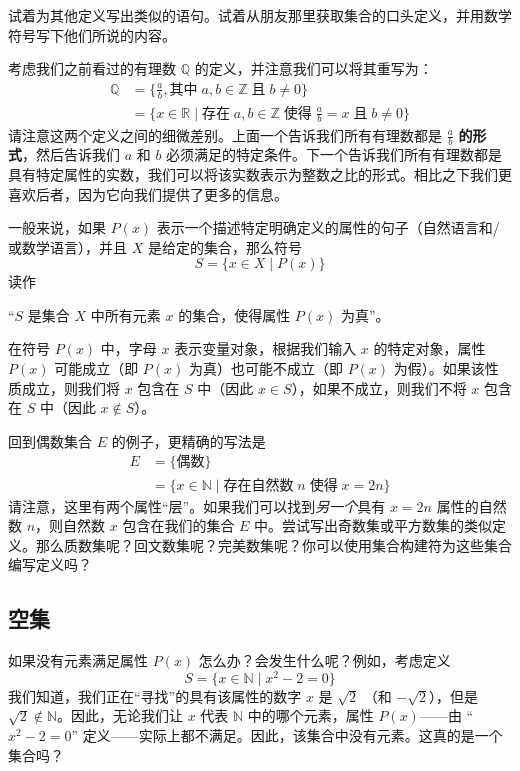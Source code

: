 试着为其他定义写出类似的语句。试着从朋友那里获取集合的口头定义，并用数学符号写下他们所说的内容。

考虑我们之前看过的有理数 $\mathbb{Q}$ 的定义，并注意我们可以将其重写为：
\begin{align*}
    \mathbb{Q} &= \Big\{\frac{a}{b}, \text{其中}\; a,b \in \mathbb{Z} \;\text{且}\; b \ne 0\Big\}\\
               &= \Big\{x \in \mathbb{R} \mid \text{存在}\; a, b \in \mathbb{Z} \;\text{使得}\; \frac{a}{b}= x \;\text{且}\; b \ne 0\Big\}
\end{align*}
请注意这两个定义之间的细微差别。上面一个告诉我们所有有理数都是 $\frac{a}{b}$ \textbf{的形式}，然后告诉我们 $a$ 和 $b$ 必须满足的特定条件。下一个告诉我们所有有理数都是具有特定属性的实数，我们可以将该实数表示为整数之比的形式。相比之下我们更喜欢后者，因为它向我们提供了更多的信息。

一般来说，如果 $P(x)$ 表示一个描述特定明确定义的属性的句子（自然语言和/或数学语言），并且 $X$ 是给定的集合，那么符号
\[S = \{x \in X \mid P(x)\}\]
读作
\begin{center}``$S$ 是集合 $X$ 中所有元素 $x$ 的集合，使得属性 $P(x)$ 为真''。\end{center}
在符号 $P(x)$ 中，字母 $x$ 表示变量对象，根据我们输入 $x$ 的特定对象，属性 $P(x)$ 可能成立（即 $P(x)$ 为真）也可能不成立（即 $P (x)$ 为假）。如果该性质成立，则我们将 $x$ 包含在 $S$ 中（因此 $x \in S$），如果不成立，则我们不将 $x$ 包含在 $S$ 中（因此 $x \notin S$）。

回到偶数集合 $E$ 的例子，更精确的写法是
\begin{align*}
    E &= \{\text{偶数}\} \\
      &= \{x \in \mathbb{N} \mid \text{存在自然数}\; n \;\text{使得}\; x = 2n\}
\end{align*}
请注意，这里有两个属性``层''。如果我们可以找到\textit{另一个}具有 $x = 2n$ 属性的自然数 $n$，则自然数 $x$ 包含在我们的集合 $E$ 中。尝试写出奇数集或平方数集的类似定义。那么质数集呢？回文数集呢？完美数集呢？你可以使用集合构建符为这些集合编写定义吗？

\subsection{空集}

如果没有元素满足属性 $P(x)$ 怎么办？会发生什么呢？例如，考虑定义
\[S = \{x \in \mathbb{N} \mid x^2 - 2 = 0\}\]
我们知道，我们正在``寻找''的具有该属性的数字 $x$ 是 $\sqrt{2}$ （和 $-\sqrt{2}$），但是 $\sqrt{2} \notin \mathbb{N}$。因此，无论我们让 $x$ 代表 $\mathbb{N}$ 中的哪个元素，属性 $P(x)$——由 ``$x^2 - 2 = 0$'' 定义——实际上都不满足。因此，该集合中没有元素。这真的是一个集合吗？

